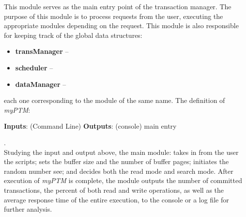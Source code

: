 This module serves as the main entry point of the transaction manager. The purpose of this module is to process requests from the user, executing the appropriate modules depending on the request. This module is also responsible for keeping track of the global data structures:

\begin{itemize}
 \item \textbf{transManager} --
 \item \textbf{scheduler} -- 
 \item  \textbf{dataManager} --
 \end{itemize}

each one corresponding to the module of the same name. The definition of \textit{myPTM}:

\begin{algorithmic}[1]

    \State \textbf{Inputs}: (Command Line)
    \State {}
    \State {}
     \State {}
     \State {}
     \State {}
      \State {}
      \State {}
      \State \textbf{Outputs}: (console)
       \State {}
        \State {}
         \State {}
    	 \State {}
	\State {}
	 {}  
	\State main entry
	\EndFunction  
\end{algorithmic}  . \\

Studying the input and output above, the main module: takes in from the user the scripts; sets the buffer size and the number of buffer pages; initiates the random number see; and decides both the read mode and search mode. After execution of \textit{myPTM} is complete, the module outputs the number of committed transactions, the percent of both read and write operations, as well as the average response time of the entire execution, to the console or a log file for further analysis.